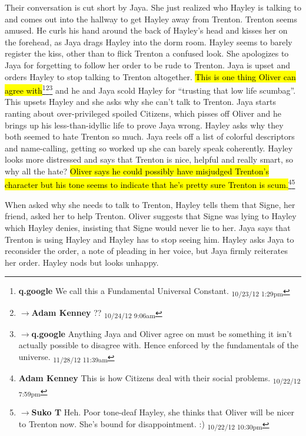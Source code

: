 Their conversation is cut short by Jaya.  She just realized who Hayley is talking to and comes out into the hallway to get Hayley away from Trenton.  Trenton seems amused.  He curls his hand around the back of Hayley's head and kisses her on the forehead, as Jaya drags Hayley into the dorm room.  Hayley seems to barely register the kiss, other than to flick Trenton a confused look.  She apologizes to Jaya for forgetting to follow her order to be rude to Trenton.  Jaya is upset and orders Hayley to stop talking to Trenton altogether.  \hl{This is one thing Oliver can agree with}\footnote{\textbf{q.google }We call this a Fundamental Universal Constant. \textsubscript{10/23/12 1:29pm}}\footnote{$\rightarrow$\textbf{Adam Kenney }?? \textsubscript{10/24/12 9:06am}}\footnote{$\rightarrow$\textbf{q.google }Anything Jaya and Oliver agree on must be something it isn't actually possible to disagree with.  Hence enforced by the fundamentals of the universe. \textsubscript{11/28/12 11:39am}} and he and Jaya scold Hayley for ``trusting that low life scumbag''.  This upsets Hayley and she asks why she can't talk to Trenton.  Jaya starts ranting about over-privileged spoiled Citizens, which pisses off Oliver and he brings up his less-than-idyllic life to prove Jaya wrong.  Hayley asks why they both seemed to hate Trenton so much.  Jaya reels off a list of colorful descriptors and name-calling, getting so worked up she can barely speak coherently.  Hayley looks more distressed and says that Trenton is nice, helpful and really smart, so why all the hate?   \hl{Oliver says he could possibly have misjudged Trenton's character but his tone seems to indicate that he's pretty sure Trenton is scum.}\footnote{\textbf{Adam Kenney }This is how Citizens deal with their social problems. \textsubscript{10/22/12 7:59pm}}\footnote{$\rightarrow$\textbf{Suko T }Heh.  Poor tone-deaf Hayley, she thinks that Oliver will be nicer to Trenton now.  She's bound for disappointment. :) \textsubscript{10/22/12 10:30pm}}



When asked why she needs to talk to Trenton, Hayley tells them that Signe, her friend, asked her to help Trenton.  Oliver suggests that Signe was lying to Hayley which Hayley denies, insisting that Signe would never lie to her.  Jaya says that Trenton is using Hayley and Hayley has to stop seeing him. Hayley asks Jaya to reconsider the order, a note of pleading in her voice, but Jaya firmly reiterates her order.  Hayley nods but looks unhappy.




